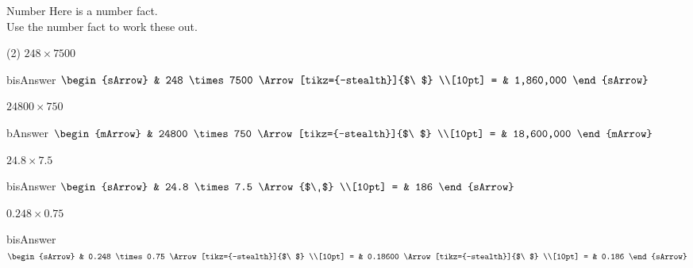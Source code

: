 \begin{boxSkill}{Number}    
  Here is a number fact.\\
       {\center {} }
  Use the number fact to work these out.\\	 
  \begin{tasks}(2)
        \task $248 \times 7500$
                \begin{envOut}[equal height group=A]{bisAnswer}
  			       $\begin{sArrow}
  			             & 248 \times 7500               \Arrow[tikz={-stealth}]{$\ $} \\[10pt]
                       = & 1,860,000              
	                \end{sArrow}$
              \end{envOut}
			  
        \task $24800 \times 750$
                \begin{envOut}[equal height group=A]{bAnswer}
  			       $\begin{mArrow}
  			             & 24800 \times 750               \Arrow[tikz={-stealth}]{$\ $} \\[10pt]
                       = & 18,600,000              
	                \end{mArrow}$
              \end{envOut}
			  
        \task $24.8 \times 7.5  $
            \begin{envOut}[equal height group=A]{bisAnswer}
    		    $\begin{sArrow}
  			             & 24.8 \times 7.5                 \Arrow{$\ $} \\[10pt]
                         = & 186                
  	                \end{sArrow}$
                \end{envOut}
  
        \task $0.248 \times 0.75$
                \begin{envOut}[equal height group=A]{bisAnswer}
  			       $\begin{sArrow}
  			             & 0.248 \times 0.75               \Arrow[tikz={-stealth}]{$\ $} \\[10pt]
                       = & 0.18600                         \Arrow[tikz={-stealth}]{$\ $} \\[10pt]
					   = & 0.186
	                \end{sArrow}$
              \end{envOut}


\end{tasks}
\end{boxSkill}

